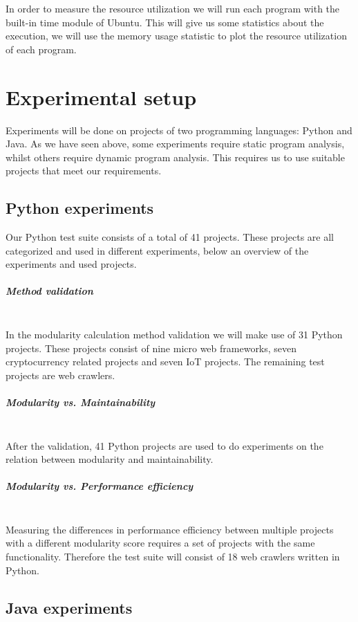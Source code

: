 \documentclass[twoside]{uva-inf-bachelor-thesis}
\newcommand{\myparagraph}[1]{\paragraph{#1}\mbox{}\\}
\begin{document}
In order to measure the resource utilization we will run each program with the built-in time module of Ubuntu. This will give us some statistics about the execution, we will use the memory usage statistic to plot the resource utilization of each program.

\chapter{Experimental setup}
Experiments will be done on projects of two programming languages: Python and Java. As we have seen above, some experiments require static program analysis, whilst others require dynamic program analysis. This requires us to use suitable projects that meet our requirements.

\section{Python experiments}
Our Python test suite consists of a total of 41 projects. These projects are all categorized and used in different experiments, below an overview of the experiments and used projects.

\myparagraph{Method validation}
In the modularity calculation method validation we will make use of 31 Python projects. These projects consist of nine micro web frameworks, seven cryptocurrency related projects and seven IoT projects. The remaining test projects are web crawlers.

\myparagraph{Modularity vs. Maintainability}
After the validation, 41 Python projects are used to do experiments on the relation between modularity and maintainability.

\myparagraph{Modularity vs. Performance efficiency}
Measuring the differences in performance efficiency between multiple projects with a different modularity score requires a set of projects with the same functionality. Therefore the test suite will consist of 18 web crawlers written in Python.

\section{Java experiments}
\end{document}
